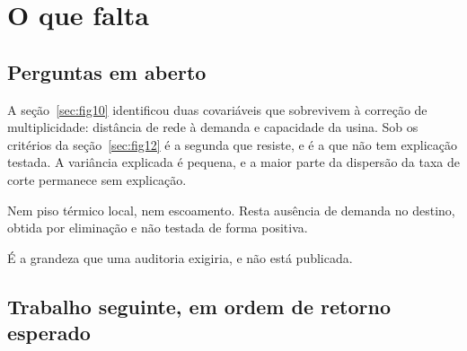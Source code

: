 \chapter{O que falta}
\label{cap:falta}

\section{Perguntas em aberto}

 A seção~\ref{sec:fig10} identificou duas
covariáveis que sobrevivem à correção de multiplicidade: distância de rede à
demanda e capacidade da usina. Sob os critérios da seção~\ref{sec:fig12} é a
segunda que resiste, e é a que não tem explicação testada. A variância explicada
é pequena, e a maior parte da dispersão da taxa de corte permanece sem
explicação.

 Nem piso térmico local, nem escoamento. Resta
ausência de demanda no destino, obtida por eliminação e não testada de forma
positiva.

 É a grandeza que
uma auditoria exigiria, e não está publicada.

\section{Trabalho seguinte, em ordem de retorno esperado}

